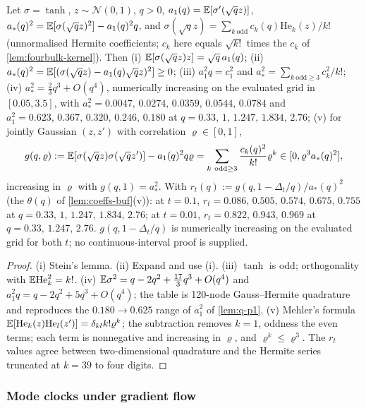 \begin{lemma}\label{lem:ge-coeff-pred}
Let $\sigma=\tanh$, $z\sim\mathcal N(0,1)$, $q>0$, $a_1(q)=\mathbb{E}[\sigma'(\sqrt q z)]$, $a_*(q)^2=\mathbb{E}[\sigma(\sqrt q z)^2]-a_1(q)^2q$, and $\sigma(\sqrt qz)=\sum_{k\ \mathrm{odd}}c_k(q)\mathrm{He}_k(z)/k!$ (unnormalised Hermite coefficients; $c_k$ here equals $\sqrt{k!}$ times the $c_k$ of \cref{lem:fourbulk-kernel}). Then (i) $\mathbb{E}[\sigma(\sqrt qz)z]=\sqrt q\,a_1(q)$; (ii) $a_*(q)^2=\mathbb{E}[(\sigma(\sqrt qz)-a_1(q)\sqrt qz)^2]\ge0$; (iii) $a_1^2q=c_1^2$ and $a_*^2=\sum_{k\ \mathrm{odd}\ge3}c_k^2/k!$; (iv) $a_*^2=\tfrac23q^3+O(q^4)$, numerically increasing on the evaluated grid in $[0.05,3.5]$, with $a_*^2=0.0047,\,0.0274,\,0.0359,\,0.0544,\,0.0784$ and $a_1^2=0.623,\,0.367,\,0.320,\,0.246,\,0.180$ at $q=0.33,\,1,\,1.247,\,1.834,\,2.76$; (v) for jointly Gaussian $(z,z')$ with correlation $\varrho\in[0,1]$,
\[ g(q,\varrho):=\E[\sigma(\sqrt qz)\sigma(\sqrt qz')]-a_1(q)^2q\varrho=\sum_{k\ \mathrm{odd}\ge3}\frac{c_k(q)^2}{k!}\varrho^k\in[0,\varrho^3a_*(q)^2], \]
increasing in $\varrho$ with $g(q,1)=a_*^2$. With $r_t(q):=g(q,1-\Delta_t/q)/a_*(q)^2$ (the $\theta(q)$ of \cref{lem:coeffs-buf}(v)): at $t=0.1$, $r_t=0.086,\,0.505,\,0.574,\,0.675,\,0.755$ at $q=0.33,\,1,\,1.247,\,1.834,\,2.76$; at $t=0.01$, $r_t=0.822,\,0.943,\,0.969$ at $q=0.33,\,1.247,\,2.76$. $g(q,1-\Delta_t/q)$ is numerically increasing on the evaluated grid for both $t$; no continuous-interval proof is supplied.
\end{lemma}
\begin{proof}
(i) Stein's lemma. (ii) Expand and use (i). (iii) $\tanh$ is odd; orthogonality with $\mathbb{E}\mathrm{He}_k^2=k!$. (iv) $\mathbb{E}\sigma^2=q-2q^2+\tfrac{17}3q^3+O(q^4)$ and $a_1^2q=q-2q^2+5q^3+O(q^4)$; the table is 120-node Gauss--Hermite quadrature and reproduces the $0.180\to0.625$ range of $a_1^2$ of \cref{lem:q-p1}. (v) Mehler's formula $\mathbb{E}[\mathrm{He}_k(z)\mathrm{He}_l(z')]=\delta_{kl}k!\varrho^k$; the subtraction removes $k=1$, oddness the even terms; each term is nonnegative and increasing in $\varrho$, and $\varrho^k\le\varrho^3$. The $r_t$ values agree between two-dimensional quadrature and the Hermite series truncated at $k=39$ to four digits.
\end{proof}

\subsubsection{Mode clocks under gradient flow}

